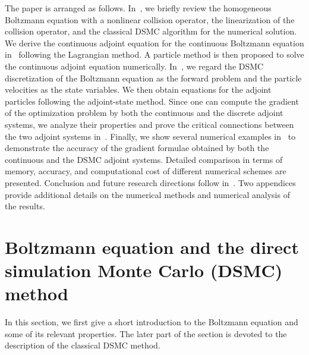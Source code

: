 \documentclass[times,final,nopreprintline]{elsarticle}
\begin{document}
The paper is arranged as follows. In~, we briefly review the homogeneous Boltzmann equation with a nonlinear collision operator, the linearization of the collision operator, and the classical DSMC algorithm for the numerical solution. We derive the continuous adjoint equation for the continuous Boltzmann equation in~ following the Lagrangian method. A particle method is then proposed to solve the continuous adjoint equation numerically.
In~, we regard the DSMC discretization of the Boltzmann equation as the forward problem and the particle velocities as the state variables. We then obtain equations for the adjoint particles following the adjoint-state method. Since one can compute the gradient of the optimization problem by both the continuous and the discrete adjoint systems, we analyze their properties and prove the critical connections between the two adjoint systems in~. Finally, we show several numerical examples in~ to demonstrate the accuracy of the gradient formulae obtained by both the continuous and the DSMC adjoint systems. Detailed comparison in terms of memory, accuracy, and computational cost of different numerical schemes are presented.
Conclusion and future research directions follow in~. Two appendices provide additional details on the numerical methods and numerical analysis of the results.








\section{Boltzmann equation and the direct simulation Monte Carlo (DSMC) method}\label{sec:background}
In this section, we first give a short introduction to the Boltzmann equation and some of its relevant properties. The later part of the section is devoted to the description of the classical DSMC method.
\end{document}
